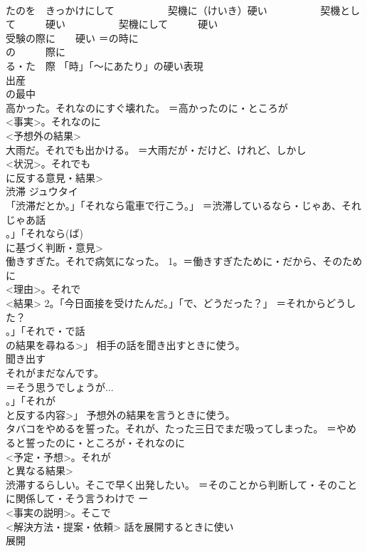 \documentclass[8pt]{extreport}
\begin{document}
\begin{CJK}{UTF8}{min}
\\	たのを　きっかけにして 　　　　　契機に（けいき）硬い 　　　　　契機として　　　硬い 　　　　　契機にして　　　硬い
\\	受験の際に　　硬い	＝の時に 
\\	の　　　際に 
\\	る・た　際 「時」「〜にあたり」の硬い表現
\\	出産	
\\	の最中	
\\	高かった。それなのにすぐ壊れた。	＝高かったのに・ところが 
\\	<事実>。それなのに
\\	<予想外の結果>
\\	大雨だ。それでも出かける。	＝大雨だが・だけど、けれど、しかし 
\\	<状況>。それでも
\\	に反する意見・結果>
\\	渋滞	ジュウタイ 
\\	「渋滞だとか。」「それなら電車で行こう。」	＝渋滞しているなら・じゃあ、それじゃあ話 
\\	。」「それなら(ば)
\\	に基づく判断・意見>
\\	働きすぎた。それで病気になった。	1。＝働きすぎたために・だから、そのために 
\\	<理由>。それで
\\	<結果> 2。「今日面接を受けたんだ。」「で、どうだった？」 ＝それからどうした？ 
\\	。」「それで・で話
\\	の結果を尋ねる>」 相手の話を聞き出すときに使う。
\\	聞き出す	
\\	それがまだなんです。	
\\	＝そう思うでしょうが... 
\\	。」「それが
\\	と反する内容>」 予想外の結果を言うときに使う。 
\\	タバコをやめるを誓った。それが、たった三日でまだ吸ってしまった。 ＝やめると誓ったのに・ところが・それなのに 
\\	<予定・予想>。それが
\\	と異なる結果>
\\	渋滞するらしい。そこで早く出発したい。	＝そのことから判断して・そのことに関係して・そう言うわけで ー
\\	<事実の説明>。そこで
\\	<解決方法・提案・依頼> 話を展開するときに使い
\\	展開	

\end{CJK}
\end{document}
